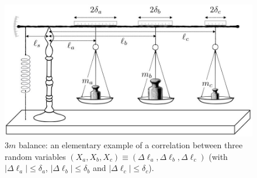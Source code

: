 \begin{figure}[h!]
 \centering
   \includegraphics[width=5in]{3M-balance.jpeg} 
   \caption{3$m$ balance: an elementary example of a correlation between three random variables $(X_a, X_b, X_c) \equiv (\Delta \ell_a, \Delta \ell_b, \Delta \ell_c)$ (with $| \Delta \ell_a | \le \delta_a$, $| \Delta \ell_b | \le \delta_b$ and $| \Delta \ell_c | \le \delta_c$).}
   \label{3M-balance}
\end{figure} 

